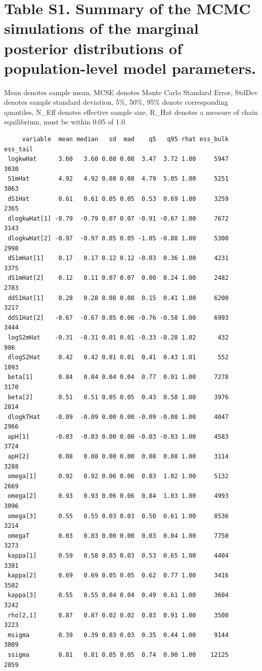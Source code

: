 \documentclass[
]{article}
\begin{document}
\newpage{}

\hypertarget{table-s1.-summary-of-the-mcmc-simulations-of-the-marginal-posterior-distributions-of-population-level-model-parameters.}{%
\section{Table S1. Summary of the MCMC simulations of the marginal
posterior distributions of population-level model
parameters.}\label{table-s1.-summary-of-the-mcmc-simulations-of-the-marginal-posterior-distributions-of-population-level-model-parameters.}}

Mean denotes sample mean, MCSE denotes Monte Carlo Standard Error,
StdDev denotes sample standard deviation, 5\%, 50\%, 95\% denote
corresponding quantiles, N\_Eff denotes effective sample size, R\_Hat
denotes a measure of chain equilibrium, must be within 0.05 of 1.0.

\begin{verbatim}
     variable  mean median   sd  mad    q5   q95 rhat ess_bulk ess_tail
 logkwHat      3.60   3.60 0.08 0.08  3.47  3.72 1.00     5947     3030
 S1mHat        4.92   4.92 0.08 0.08  4.79  5.05 1.00     5251     3063
 dS1Hat        0.61   0.61 0.05 0.05  0.53  0.69 1.00     3259     2365
 dlogkwHat[1] -0.79  -0.79 0.07 0.07 -0.91 -0.67 1.00     7672     3143
 dlogkwHat[2] -0.97  -0.97 0.05 0.05 -1.05 -0.88 1.00     5300     2998
 dS1mHat[1]    0.17   0.17 0.12 0.12 -0.03  0.36 1.00     4231     3375
 dS1mHat[2]    0.12   0.11 0.07 0.07  0.00  0.24 1.00     2482     2783
 ddS1Hat[1]    0.28   0.28 0.08 0.08  0.15  0.41 1.00     6200     3217
 ddS1Hat[2]   -0.67  -0.67 0.05 0.06 -0.76 -0.58 1.00     6993     3444
 logS2mHat    -0.31  -0.31 0.01 0.01 -0.33 -0.28 1.02      432      986
 dlogS2Hat     0.42   0.42 0.01 0.01  0.41  0.43 1.01      552     1093
 beta[1]       0.84   0.84 0.04 0.04  0.77  0.91 1.00     7278     3170
 beta[2]       0.51   0.51 0.05 0.05  0.43  0.58 1.00     3976     2814
 dlogkTHat    -0.09  -0.09 0.00 0.00 -0.09 -0.08 1.00     4047     2966
 apH[1]       -0.03  -0.03 0.00 0.00 -0.03 -0.03 1.00     4583     3724
 apH[2]        0.08   0.08 0.00 0.00  0.08  0.08 1.00     3114     3288
 omega[1]      0.92   0.92 0.06 0.06  0.83  1.02 1.00     5132     2669
 omega[2]      0.93   0.93 0.06 0.06  0.84  1.03 1.00     4993     3096
 omega[3]      0.55   0.55 0.03 0.03  0.50  0.61 1.00     8536     3214
 omegaT        0.03   0.03 0.00 0.00  0.03  0.04 1.00     7750     3273
 kappa[1]      0.59   0.58 0.03 0.03  0.53  0.65 1.00     4404     3301
 kappa[2]      0.69   0.69 0.05 0.05  0.62  0.77 1.00     3416     3502
 kappa[3]      0.55   0.55 0.04 0.04  0.49  0.61 1.00     3604     3242
 rho[2,1]      0.87   0.87 0.02 0.02  0.83  0.91 1.00     3500     3223
 msigma        0.39   0.39 0.03 0.03  0.35  0.44 1.00     9144     3009
 ssigma        0.81   0.81 0.05 0.05  0.74  0.90 1.00    12125     2859
\end{verbatim}
\end{document}

